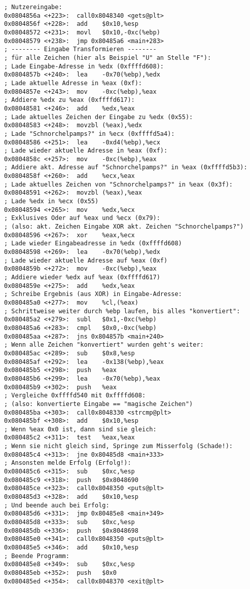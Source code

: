 \documentclass{scrartcl}
\begin{document}
\begin{lstlisting}[language={[x86masm]Assembler}]
; Nutzereingabe:
0x0804856a <+223>:	call0x8048340 <gets@plt>
0x0804856f <+228>:	add    $0x10,%esp
0x08048572 <+231>:	movl   $0x10,-0xc(%ebp)
0x08048579 <+238>:	jmp 0x80485a6 <main+283>
; -------- Eingabe Transformieren --------
; für alle Zeichen (hier als Beispiel "U" an Stelle "F"):
; Lade Eingabe-Adresse in %edx (0xffffd608):
0x0804857b <+240>:	lea    -0x70(%ebp),%edx
; Lade aktuelle Adresse in %eax (0xf):
0x0804857e <+243>:	mov    -0xc(%ebp),%eax
; Addiere %edx zu %eax (0xffffd617):
0x08048581 <+246>:	add    %edx,%eax
; Lade aktuelles Zeichen der Eingabe zu %edx (0x55):
0x08048583 <+248>:	movzbl (%eax),%edx
; Lade "Schnorchelpamps?" in %ecx (0xffffd5a4):
0x08048586 <+251>:	lea    -0xd4(%ebp),%ecx
; Lade wieder aktuelle Adresse in %eax (0xf):
0x0804858c <+257>:	mov    -0xc(%ebp),%eax
; Addiere akt. Adresse auf "Schnorchelpamps?" in %eax (0xffffd5b3):
0x0804858f <+260>:	add    %ecx,%eax
; Lade aktuelles Zeichen von "Schnorchelpamps?" in %eax (0x3f):
0x08048591 <+262>:	movzbl (%eax),%eax
; Lade %edx in %ecx (0x55)
0x08048594 <+265>:	mov    %edx,%ecx
; Exklusives Oder auf %eax und %ecx (0x79):
; (also: akt. Zeichen Eingabe XOR akt. Zeichen "Schnorchelpamps?")
0x08048596 <+267>:	xor    %eax,%ecx
; Lade wieder Eingabeadresse in %edx (0xffffd608)
0x08048598 <+269>:	lea    -0x70(%ebp),%edx
; Lade wieder aktuelle Adresse auf %eax (0xf)
0x0804859b <+272>:	mov    -0xc(%ebp),%eax
; Addiere wieder %edx auf %eax (0xffffd617)
0x0804859e <+275>:	add    %edx,%eax
; Schreibe Ergebnis (aus XOR) in Eingabe-Adresse:
0x080485a0 <+277>:	mov    %cl,(%eax)
; Schrittweise weiter durch %ebp laufen, bis alles "konvertiert":
0x080485a2 <+279>:	subl   $0x1,-0xc(%ebp)
0x080485a6 <+283>:	cmpl   $0x0,-0xc(%ebp)
0x080485aa <+287>:	jns 0x804857b <main+240>
; Wenn alle Zeichen "konvertiert" wurden geht's weiter:
0x080485ac <+289>:	sub    $0x8,%esp
0x080485af <+292>:	lea    -0x138(%ebp),%eax
0x080485b5 <+298>:	push   %eax
0x080485b6 <+299>:	lea    -0x70(%ebp),%eax
0x080485b9 <+302>:	push   %eax
; Vergleiche 0xffffd540 mit 0xffffd608:
; (also: konvertierte Eingabe == "magische Zeichen")
0x080485ba <+303>:	call0x8048330 <strcmp@plt>
0x080485bf <+308>:	add    $0x10,%esp
; Wenn %eax 0x0 ist, dann sind sie gleich:
0x080485c2 <+311>:	test   %eax,%eax
; Wenn sie nicht gleich sind, Springe zum Misserfolg (Schade!):
0x080485c4 <+313>:	jne 0x80485d8 <main+333>
; Ansonsten melde Erfolg (Erfolg!):
0x080485c6 <+315>:	sub    $0xc,%esp
0x080485c9 <+318>:	push   $0x8048690
0x080485ce <+323>:	call0x8048350 <puts@plt>
0x080485d3 <+328>:	add    $0x10,%esp
; Und beende auch bei Erfolg:
0x080485d6 <+331>:	jmp 0x80485e8 <main+349>
0x080485d8 <+333>:	sub    $0xc,%esp
0x080485db <+336>:	push   $0x8048698
0x080485e0 <+341>:	call0x8048350 <puts@plt>
0x080485e5 <+346>:	add    $0x10,%esp
; Beende Programm:
0x080485e8 <+349>:	sub    $0xc,%esp
0x080485eb <+352>:	push   $0x0
0x080485ed <+354>:	call0x8048370 <exit@plt>
\end{lstlisting}
\end{document}
